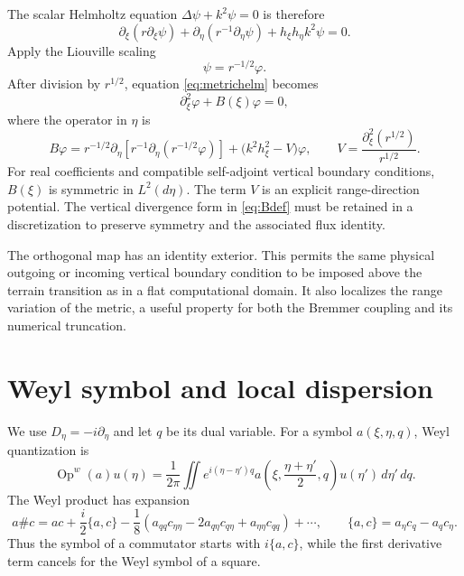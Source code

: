 \documentclass[11pt]{article}
\newcommand{\pd}{\partial}
\newcommand{\Op}{\operatorname{Op}^{w}}
\begin{document}
The scalar Helmholtz equation $\Delta\psi+k^2\psi=0$ is therefore
\begin{equation}\label{eq:metrichelm}
  \pd_\xi(r\pd_\xi\psi)+\pd_\eta(r^{-1}\pd_\eta\psi)
  +h_\xi h_\eta k^2\psi=0.
\end{equation}
Apply the Liouville scaling
\begin{equation}\label{eq:liouville}
  \psi=r^{-1/2}\varphi.
\end{equation}
After division by $r^{1/2}$, equation \eqref{eq:metrichelm} becomes
\begin{equation}\label{eq:rangeeq}
  \pd_\xi^2\varphi+B(\xi)\varphi=0,
\end{equation}
where the operator in $\eta$ is
\begin{equation}\label{eq:Bdef}
  B\varphi=r^{-1/2}\pd_\eta\!\left[r^{-1}\pd_\eta
  (r^{-1/2}\varphi)\right]+\bigl(k^2h_\xi^2-V\bigr)\varphi,
  \qquad
  V=\frac{\pd_\xi^2(r^{1/2})}{r^{1/2}}.
\end{equation}
For real coefficients and compatible self-adjoint vertical boundary
conditions, $B(\xi)$ is symmetric in $L^2(d\eta)$. The term $V$ is an
explicit range-direction potential. The vertical divergence form in
\eqref{eq:Bdef} must be retained in a discretization to preserve symmetry and
the associated flux identity.

The orthogonal map has an identity exterior. This permits the same physical
outgoing or incoming vertical boundary condition to be imposed above the
terrain transition as in a flat computational domain. It also localizes the
range variation of the metric, a useful property for both the Bremmer
coupling and its numerical truncation.

\section{Weyl symbol and local dispersion}

We use $D_\eta=-i\pd_\eta$ and let $q$ be its dual variable. For a symbol
$a(\xi,\eta,q)$, Weyl quantization is
\begin{equation}\label{eq:weyl}
  \Op(a)u(\eta)=\frac{1}{2\pi}\iint e^{i(\eta-\eta')q}
  a\!\left(\xi,\frac{\eta+\eta'}2,q\right)u(\eta')\,d\eta'\,dq.
\end{equation}
The Weyl product has expansion
\begin{equation}\label{eq:moyal}
 a\# c=ac+\frac{i}{2}\{a,c\}
 -\frac18\left(a_{qq}c_{\eta\eta}-2a_{q\eta}c_{q\eta}
 +a_{\eta\eta}c_{qq}\right)+\cdots,
 \qquad \{a,c\}=a_\eta c_q-a_qc_\eta.
\end{equation}
Thus the symbol of a commutator starts with $i\{a,c\}$, while the first
derivative term cancels for the Weyl symbol of a square.
\end{document}

